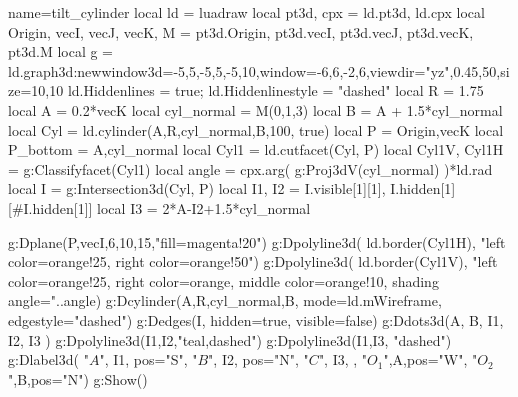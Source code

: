 \documentclass{standalone}
\begin{document}
\begin{luadraw}{name=tilt_cylinder}
local ld = luadraw
local pt3d, cpx = ld.pt3d, ld.cpx
local Origin, vecI, vecJ, vecK, M = pt3d.Origin, pt3d.vecI, pt3d.vecJ, pt3d.vecK, pt3d.M
local g = ld.graph3d:new{window3d={-5,5,-5,5,-5,10},window={-6,6,-2,6},viewdir={"yz",0.45,50},size={10,10}}
ld.Hiddenlines = true; ld.Hiddenlinestyle = "dashed"
local R = 1.75
local A = 0.2*vecK
local cyl_normal = M(0,1,3)
local B = A + 1.5*cyl_normal
local Cyl = ld.cylinder(A,R,cyl_normal,B,100, true)
local P = {Origin,vecK}
local P_bottom = {A,cyl_normal}
local Cyl1 = ld.cutfacet(Cyl, P)
local Cyl1V, Cyl1H = g:Classifyfacet(Cyl1)
local angle = cpx.arg( g:Proj3dV(cyl_normal) )*ld.rad
local I = g:Intersection3d(Cyl, P)
local I1, I2 = I.visible[1][1], I.hidden[1][#I.hidden[1]]
local I3 = 2*A-I2+1.5*cyl_normal

g:Dplane(P,vecI,6,10,15,"fill=magenta!20")
g:Dpolyline3d( ld.border(Cyl1H), "left color=orange!25, right color=orange!50")
g:Dpolyline3d( ld.border(Cyl1V), "left color=orange!25, right color=orange, middle color=orange!10, shading angle="..angle)
g:Dcylinder(A,R,cyl_normal,B, {mode=ld.mWireframe, edgestyle="dashed"})
g:Dedges(I, {hidden=true, visible=false})
g:Ddots3d({A, B, I1, I2, I3} )
g:Dpolyline3d({I1,I2},"teal,dashed")
g:Dpolyline3d({I1,I3}, "dashed")
g:Dlabel3d( "$A$", I1, {pos="S"}, "$B$", I2, {pos="N"}, "$C$", I3, {}, "$O_1$",A,{pos="W"}, "$O_2$",B,{pos="N"})
g:Show()
\end{luadraw}
\end{document}
